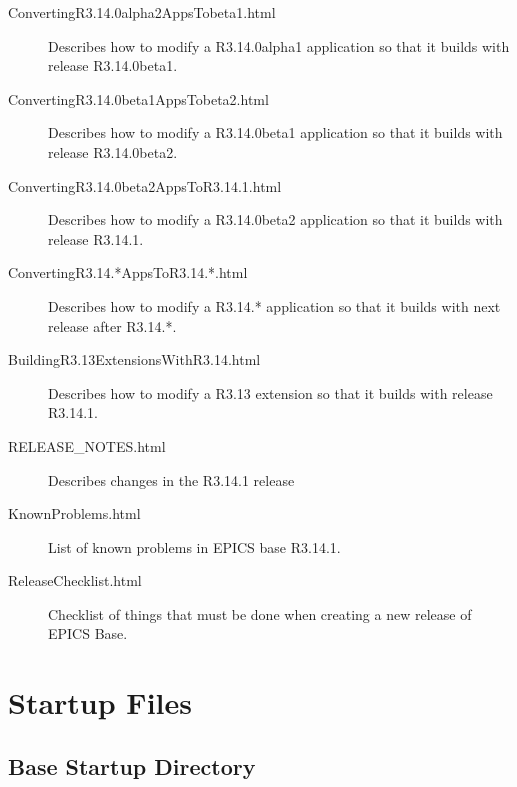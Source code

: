 \begin{description}
\item[ConvertingR3.14.0alpha2AppsTobeta1.html]

Describes how to modify a R3.14.0alpha1 application so that it builds with release R3.14.0beta1.

\item[ConvertingR3.14.0beta1AppsTobeta2.html]

Describes how to modify a R3.14.0beta1 application so that it builds with release R3.14.0beta2.

\item[ConvertingR3.14.0beta2AppsToR3.14.1.html]

Describes how to modify a R3.14.0beta2 application so that it builds with release R3.14.1.

\item[ConvertingR3.14.*AppsToR3.14.*.html]

Describes how to modify a R3.14.* application so that it builds with next release after R3.14.*.

\item[BuildingR3.13ExtensionsWithR3.14.html]

Describes how to modify a R3.13 extension so that it builds with release R3.14.1.

\item[RELEASE\_NOTES.html]

Describes changes in the R3.14.1 release

\item[KnownProblems.html]

List of known problems in EPICS base R3.14.1.

\item[ReleaseChecklist.html]

Checklist of things that must be done when creating a new release of EPICS Base.

\end{description}

\section{Startup Files}


\subsection{Base Startup Directory}

